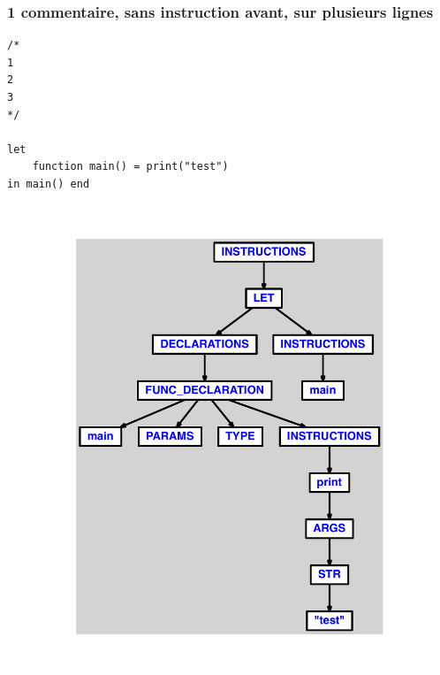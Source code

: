 \documentclass{article}
\begin{document}
\subsubsection{1 commentaire, sans instruction avant, sur plusieurs lignes}
\begin{lstlisting}
/*
1
2
3
*/

let
	function main() = print("test")
in main() end
\end{lstlisting}
\newpage
\begin{figure}[H]
\centering
\includegraphics[max width=\textwidth]{ast/ast_151.pdf}
\end{figure}
\newpage
\end{document}
